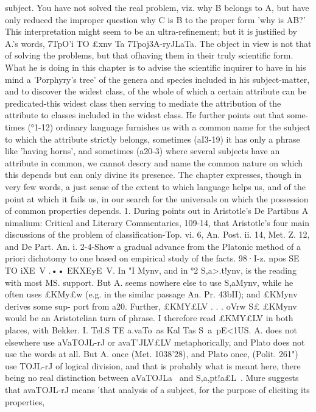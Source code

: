 {{{{{{{{{{{{{{{{{{{{{{{{{{{{{{{{{{{{{{{{{{{{{{{{{{{{{{{{{{{{{{{{{{{{subject. You have not solved the real problem, viz. why B belongs
to A, but have only reduced the improper question why C is B
to the proper form 'why is AB?'
This interpretation might seem to be an ultra-refinement; but
it is justified by A.'s words, 7TpO'i TO £xnv Ta 7Tpoj3A-ryJLaTa. The
object in view is not that of solving the problems, but that ofhaving them in their truly scientific form. What he is doing
in this chapter is to advise the scientific inquirer to have in his
mind a 'Porphyry's tree' of the genera and species included in
his subject-matter, and to discover the widest class, of the whole
of which a certain attribute can be predicated-this widest class
then serving to mediate the attribution of the attribute to classes
included in the widest class. He further points out that some-
times (°1-12) ordinary language furnishes us with a common name
for the subject to which the attribute strictly belongs, sometimes
(aI3-19) it has only a phrase like 'having horns', and sometimes
(a20-3) where several subjects have an attribute in common, we
cannot descry and name the common nature on which this depends
but can only divine its presence. The chapter expresses, though
in very few words, a just sense of the extent to which language
helps us, and of the point at which it fails us, in our search for the
universals on which the possession of common properties depends.
1. During points out in Aristotle's De Partibus A nimalium:
Critical and Literary Commentaries, 109-14, that Aristotle's four
main discussions of the problem of classification-Top. vi. 6,
An. Post. ii. 14, Met. Z. 12, and De Part. An. i. 2-4-Show a
gradual advance from the Platonic method of a priori dichotomy
to one based on empirical study of the facts.
98·I-z. npos SE TO iXE~V .•• EKXEyE~V. In "I Mynv, and in °2
S,a>.t!ynv, is the reading with most MS. support. But A. seems
nowhere else to use S,aMynv, while he often uses £KMy£w (e.g. in
the similar passage An. Pr. 43bII); and £KMynv derives some sup-
port from a20. Further, £KMY£LV . . . oVrw S£ £KMynv would be
an Aristotelian turn of phrase. I therefore read £KMY£LV in both
places, with Bekker.
I. Tel.S TE a.vaTo~as Kal Tas S~a~pE<1US. A. does not elsewhere
use aVaTOJL-rJ or avaT'JLV£LV metaphorically, and Plato does not use
the words at all. But A. once (Met. 1038'28), and Plato once,
(Polit. 261") use TOJL-rJ of logical division, and that is probably
what is meant here, there being no real distinction between
aVaTOJLa~ and S,a,pt!a£L~. Mure suggests that avaTOJL-rJ means 'that
analysis of a subject, for the purpose of eliciting its properties,
}}}}}}}}}}}}}}}}}}}}}}}}}}}}}}}}}}}}}}}}}}}}}}}}}}}}}}}}}}}}}}}}}}}}
